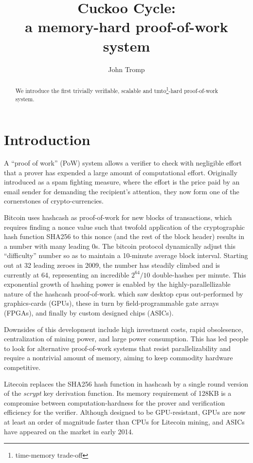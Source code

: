 \documentclass[11pt, oneside]{article}
\title{Cuckoo Cycle: \protect\\ a memory-hard proof-of-work system}
\author{John Tromp}
\begin{document}
\maketitle

\begin{abstract}
We introduce the first trivially verifiable, scalable and tmto\footnote{time-memory trade-off}-hard proof-of-work system.
\end{abstract}

\section{Introduction}
A ``proof of work'' (PoW) system allows a verifier to check with
negligible effort that a prover has expended a large amount of computational effort.
Originally introduced as a spam fighting measure, 
where the effort is the price paid by an email sender for demanding the recipient's attention,
they now form one of the cornerstones of crypto-currencies.

Bitcoin\cite{nakamoto2009bitcoin} uses hashcash\cite{back2002} as proof-of-work for
new blocks of transactions, which requires finding a nonce value such that
twofold application of the cryptographic hash function SHA256
to this nonce (and the rest of the block header) results in a number with many
leading 0s.  The bitcoin protocol dynamically adjust this ``difficulty'' number
so as to maintain a 10-minute average block interval. Starting out at 32 leading zeroes in 2009,
the number has steadily climbed and is currently at 64, representing
an incredible $2^{64}/10$ double-hashes per minute. This exponential growth of hashing power
is enabled by the highly-parallellizable nature of the hashcash proof-of-work.
which saw desktop cpus out-performed by graphics-cards (GPUs),
these in turn by field-programmable gate arrays (FPGAs),
and finally by custom designed chips (ASICs).

Downsides of this development include high investment costs, rapid obsolesence,
centralization of mining power, and large power consumption.
This has led people to look for alternative proof-of-work systems that resist parallelizability
and require a nontrivial amount of memory, aiming to keep commodity hardware competitive.

Litecoin replaces the SHA256 hash function in hashcash by a single round version of the
{\em scrypt} key derivation function. Its memory requirement of 128KB is a compromise
between computation-hardness for the prover and verification efficiency for the verifier.
Although designed to be GPU-resistant, GPUs are now at least an order of magnitude faster
than CPUs for Litecoin mining, and ASICs have appeared on the market in early 2014.
\end{document}
